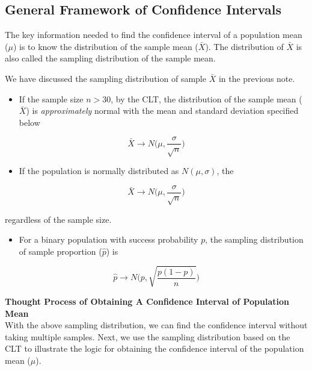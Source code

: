 \documentclass[
]{book}
\providecommand{\tightlist}{%
  \setlength{\itemsep}{0pt}\setlength{\parskip}{0pt}}
\begin{document}
\hfill\break

\hypertarget{general-framework-of-confidence-intervals}{%
\subsection{General Framework of Confidence Intervals}\label{general-framework-of-confidence-intervals}}

The key information needed to find the confidence interval of a population mean (\(\mu\)) is to know the distribution of the sample mean (\(\bar{X}\)). The distribution of \(\bar{X}\) is also called the sampling distribution of the sample mean.

We have discussed the sampling distribution of sample \(\bar{X}\) in the previous note.

\begin{itemize}
\tightlist
\item
  If the sample size \(n > 30\), by the CLT, the distribution of the sample mean (\(\bar{X}\)) is \emph{approximately} normal with the mean and standard deviation specified below
\end{itemize}

\[
\bar{X} \to N\Big( \mu, \frac{\sigma}{\sqrt{n}} \Big)
\]

\begin{itemize}
\tightlist
\item
  If the population is normally distributed as \(N(\mu, \sigma)\), the
\end{itemize}

\[
\bar{X} \to N\Big( \mu, \frac{\sigma}{\sqrt{n}} \Big)
\]

regardless of the sample size.

\begin{itemize}
\tightlist
\item
  For a binary population with success probability \(p\), the sampling distribution of sample proportion (\(\hat{p}\)) is
\end{itemize}

\[
\hat{p} \to N\Big(p, \sqrt{\frac{p(1-p)}{n}} \Big)
\]

\hfill\break
\textbf{Thought Process of Obtaining A Confidence Interval of Population Mean}\\

With the above sampling distribution, we can find the confidence interval without taking multiple samples. Next, we use the sampling distribution based on the CLT to illustrate the logic for obtaining the confidence interval of the population mean (\(\mu\)).
\end{document}
